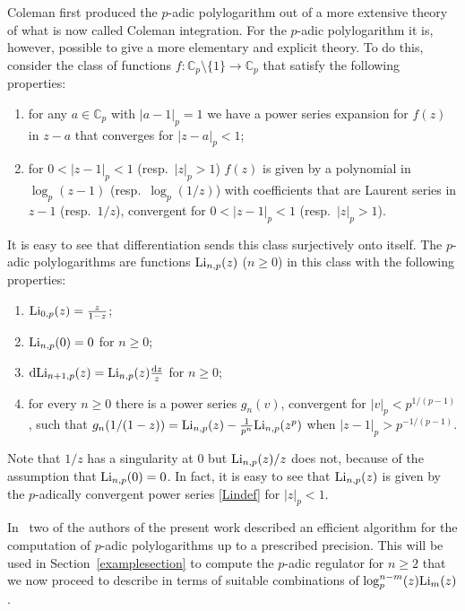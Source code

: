 \documentclass{amsart}
\begin{document}
Coleman first produced the $p$-adic polylogarithm out of a more
extensive theory of what is now called Coleman integration. For the
$p$-adic polylogarithm it is, however, possible to
give a more elementary and explicit theory.
To do this, consider the
class of functions $f: {{\mathbb C_p}}\setminus\{1\} \to {{\mathbb C_p}}$ that satisfy the following properties:
\begin{enumerate}
\item for any $a\in {{\mathbb C_p}}$ with $|a-1|_p=1$ we have a power series expansion
  for $f(z)$ in $z-a$ that converges for $|z-a|_p<1$;
\item for $0<|z-1|_p<1$ (resp.\ $|z|_p>1$) $ f(z) $ is  given by a polynomial in $\log_p(z-1)$
  (resp.\ $\log_p(1/z)$) with coefficients that are Laurent series in
  $z-1$ (resp.\ $1/z$), convergent for $0<|z-1|_p<1$ (resp.\ $|z|_p>1$).
\end{enumerate}
It is easy to see that differentiation sends this class surjectively onto itself.
The $p$-adic polylogarithms are functions ${\textup{Li}}_{n,p}(z) $ ($ n \ge 0 $)
in this class with the following properties:
\begin{enumerate}
\item ${\textup{Li}}_{0,p}(z) = \frac{z}{1-z}$;
\item ${\textup{Li}}_{n,p}(0) = 0 $ for $n\ge 0 $;
\item $ {{\textup{d}}} {\textup{Li}}_{n+1,p}(z) = {\textup{Li}}_{n,p}(z) \frac{{{\textup{d}}}  z}{z}$ for $n\ge 0 $;
\item for every $ n \ge 0 $ there is a power series $ g_n(v) $, convergent for $ |v|_p < p^{1/(p-1)} $,
such that $ g_n(1/(1-z)) = {\textup{Li}}_{n,p}(z)  - \frac{1}{p^n} {\textup{Li}}_{n,p}(z^p)$ when $ |z-1|_p>  p^{-1/(p-1)}$.
\end{enumerate}
Note that $1/z$ has a singularity at $0$ but $ {\textup{Li}}_{n,p}(z) /z$ does not,
because of the assumption that ${\textup{Li}}_{n,p}(0) = 0 $. In fact, it is easy to
see that ${\textup{Li}}_{n,p}(z)$ is given by the $p$-adically convergent power
series \eqref{Lindef} for $|z|_p<1$.

In~\cite{BdJ06} two of the authors of the present work described an
efficient algorithm for the computation of $p$-adic polylogarithms up to a prescribed precision.
This will be used in Section~\ref{examplesection} to compute the {$p$-adic{\futurelet{}}} regulator for $ n \ge 2 $ that we now proceed
to describe in terms of suitable combinations of $ \log_p^{n-m}(z) {\textup{Li}}_{m}(z) $.
\end{document}
